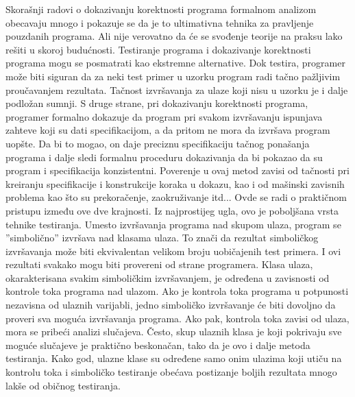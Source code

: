 \documentclass[a4paper]{article}
\begin{document}
{Skorašnji radovi o dokazivanju korektnosti programa formalnom analizom obecavaju mnogo i pokazuje se da je to ultimativna tehnika za pravljenje pouzdanih programa. Ali nije verovatno da će se svođenje teorije na praksu lako rešiti u skoroj budućnosti. Testiranje programa i dokazivanje korektnosti programa mogu se posmatrati kao ekstremne alternative. Dok testira, programer može biti siguran da za neki test primer u uzorku program radi tačno pažljivim proučavanjem rezultata. Tačnost izvršavanja za ulaze koji nisu u uzorku je i dalje podložan sumnji. S druge strane, pri dokazivanju korektnosti programa, programer formalno dokazuje da program pri svakom izvršavanju ispunjava zahteve koji su dati specifikacijom, a da pritom ne mora da izvršava program uopšte. Da bi to mogao, on daje preciznu specifikaciju tačnog ponašanja programa i dalje sledi formalnu proceduru dokazivanja da bi pokazao da su program i specifikacija konzistentni. Poverenje u ovaj metod zavisi od tačnosti pri kreiranju specifikacije i konstrukcije koraka u dokazu, kao i od mašinski zavisnih problema kao što su prekoračenje, zaokruživanje itd...  Ovde se radi o praktičnom pristupu između ove dve krajnosti. Iz najprostijeg ugla, ovo je poboljšana vrsta tehnike testiranja. Umesto izvršavanja programa nad skupom ulaza, program se ''simbolično'' izvršava nad klasama ulaza. To znači da rezultat simboličkog izvršavanja može biti ekvivalentan velikom broju uobičajenih test primera. I ovi rezultati svakako mogu biti provereni od strane programera. Klasa ulaza, okarakterisana svakim simboličkim izvršavanjem, je određena u zavisnosti od kontrole toka programa nad ulazom. Ako je kontrola toka programa u potpunosti nezavisna od ulaznih varijabli, jedno simboličko izvršavanje će biti dovoljno da proveri sva moguća izvršavanja programa. Ako pak, kontrola toka zavisi od ulaza, mora se pribeći analizi slučajeva. Često, skup ulaznih klasa je koji pokrivaju sve moguće slučajeve je praktično beskonačan, tako da je ovo i dalje metoda testiranja. Kako god, ulazne klase su određene samo onim ulazima koji utiču na kontrolu toka i simboličko testiranje obećava postizanje boljih rezultata mnogo lakše od običnog testiranja.  


}
\end{document}
